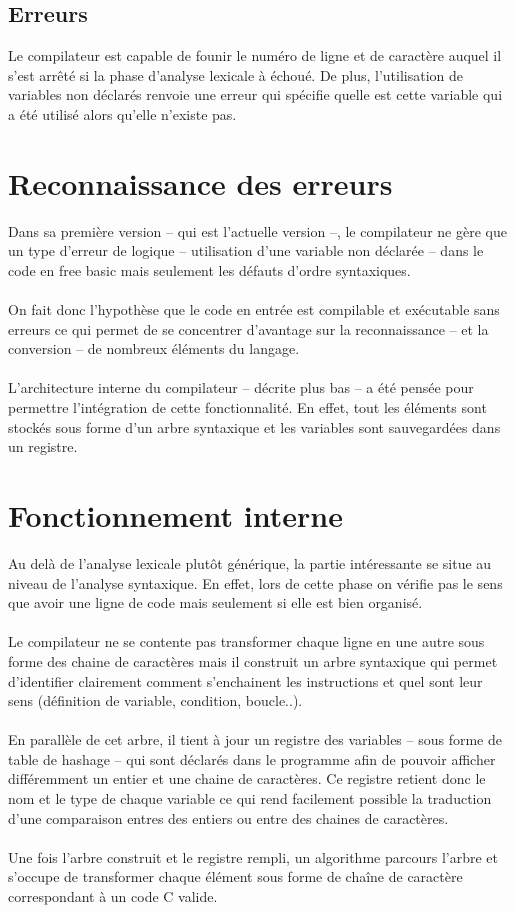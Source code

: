 \documentclass{article}
\begin{document}
\subsection{Erreurs}
Le compilateur est capable de founir le numéro de ligne et de caractère auquel il s'est arrêté si la phase
d'analyse lexicale à échoué. De plus, l'utilisation de variables non déclarés renvoie une erreur qui spécifie
quelle est cette variable qui a été utilisé alors qu'elle n'existe pas.
	
\section{Reconnaissance des erreurs}
Dans sa première version -- qui est l'actuelle version --, le compilateur ne gère que un type 
d'erreur de logique -- utilisation d'une variable non déclarée -- dans le code 
en free basic mais seulement les défauts d'ordre syntaxiques.
\\\\
On fait donc l'hypothèse que le code en entrée est compilable et exécutable sans erreurs
ce qui permet de se concentrer d'avantage sur la reconnaissance -- et la conversion -- 
de nombreux éléments du langage.
\\\\
L'architecture interne du compilateur -- décrite plus bas -- a été pensée pour permettre
l'intégration de cette fonctionnalité. En effet, tout les éléments sont stockés sous forme
d'un arbre syntaxique et les variables sont sauvegardées dans un registre.
	
\section{Fonctionnement interne}
Au delà de l'analyse lexicale plutôt générique, la partie intéressante se situe au niveau
de l'analyse syntaxique. En effet, lors de cette phase on vérifie pas le sens que avoir 
une ligne de code mais 
seulement si elle est bien organisé. 
\\\\
Le compilateur ne se contente pas transformer 
chaque ligne en une autre sous forme des chaine de caractères mais il construit un 
arbre syntaxique qui permet d'identifier clairement comment s'enchainent les instructions
et quel sont leur sens (définition de variable, condition, boucle..).
\\\\
En parallèle de cet arbre, il tient à jour un registre des variables -- sous forme de 
table de hashage -- qui sont déclarés dans le programme afin de pouvoir afficher 
différemment un entier et une chaine de caractères. Ce registre retient donc le nom et le
type de chaque variable ce qui rend facilement possible la traduction d'une comparaison 
entres des entiers ou entre des chaines de caractères.
\\\\
Une fois l'arbre construit et le registre rempli, un algorithme parcours l'arbre et 
s'occupe de transformer chaque élément sous forme de chaîne de caractère correspondant
à un code C valide.
\end{document}
